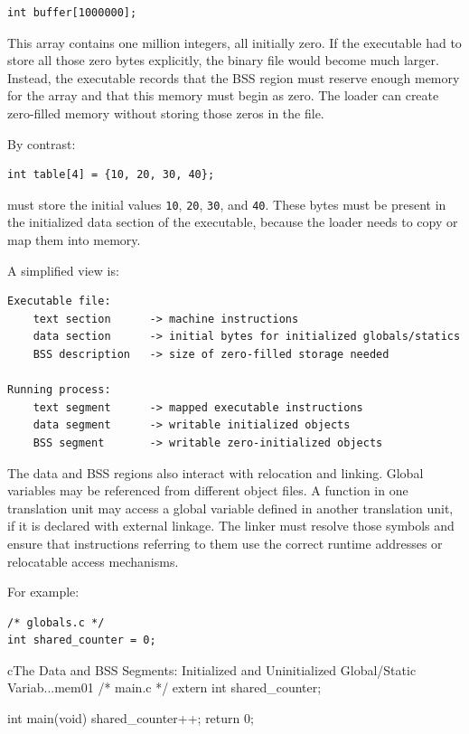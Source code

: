 \begin{verbatim}
int buffer[1000000];
\end{verbatim}

This array contains one million integers, all initially zero. If the executable had to store all those zero bytes explicitly, the binary file would become much larger. Instead, the executable records that the BSS region must reserve enough memory for the array and that this memory must begin as zero. The loader can create zero-filled memory without storing those zeros in the file.

By contrast:

\begin{verbatim}
int table[4] = {10, 20, 30, 40};
\end{verbatim}

must store the initial values \texttt{10}, \texttt{20}, \texttt{30}, and \texttt{40}. These bytes must be present in the initialized data section of the executable, because the loader needs to copy or map them into memory.

A simplified view is:

\begin{verbatim}
Executable file:
    text section      -> machine instructions
    data section      -> initial bytes for initialized globals/statics
    BSS description   -> size of zero-filled storage needed

Running process:
    text segment      -> mapped executable instructions
    data segment      -> writable initialized objects
    BSS segment       -> writable zero-initialized objects
\end{verbatim}

The data and BSS regions also interact with relocation and linking. Global variables may be referenced from different object files. A function in one translation unit may access a global variable defined in another translation unit, if it is declared with external linkage. The linker must resolve those symbols and ensure that instructions referring to them use the correct runtime addresses or relocatable access mechanisms.

For example:

\begin{verbatim}
/* globals.c */
int shared_counter = 0;
\end{verbatim}

\begin{codebox}[]{c}{The Data and BSS Segments: Initialized and Uninitialized Global/Static Variab...}{mem01}
/* main.c */
extern int shared_counter;

int main(void) {
    shared_counter++;
    return 0;
}
\end{codebox}


